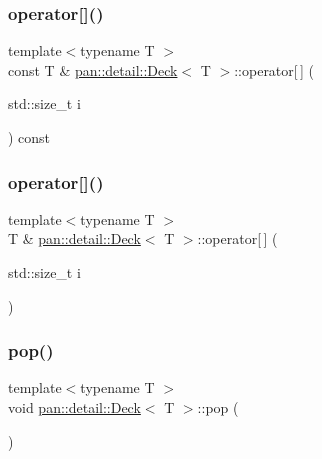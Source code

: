 \subsubsection{\texorpdfstring{operator[]()}{operator[]()}\hspace{0.1cm}{\footnotesize\ttfamily [1/2]}}
{\footnotesize\ttfamily template$<$typename T $>$ \\
const T \& \hyperlink{classpan_1_1detail_1_1_deck}{pan\+::detail\+::\+Deck}$<$ T $>$\+::operator\mbox{[}$\,$\mbox{]} (\begin{DoxyParamCaption}\item[{std\+::size\+\_\+t}]{i }\end{DoxyParamCaption}) const\hspace{0.3cm}{\ttfamily [inline]}}

\mbox{\label{classpan_1_1detail_1_1_deck_ab9d32067fc206985aa116c47cb061809}} 
\subsubsection{\texorpdfstring{operator[]()}{operator[]()}\hspace{0.1cm}{\footnotesize\ttfamily [2/2]}}
{\footnotesize\ttfamily template$<$typename T $>$ \\
T \& \hyperlink{classpan_1_1detail_1_1_deck}{pan\+::detail\+::\+Deck}$<$ T $>$\+::operator\mbox{[}$\,$\mbox{]} (\begin{DoxyParamCaption}\item[{std\+::size\+\_\+t}]{i }\end{DoxyParamCaption})\hspace{0.3cm}{\ttfamily [inline]}}

\mbox{\label{classpan_1_1detail_1_1_deck_ae40b687cc780fbff6411d4679e54b872}} 
\subsubsection{\texorpdfstring{pop()}{pop()}}
{\footnotesize\ttfamily template$<$typename T $>$ \\
void \hyperlink{classpan_1_1detail_1_1_deck}{pan\+::detail\+::\+Deck}$<$ T $>$\+::pop (\begin{DoxyParamCaption}{ }\end{DoxyParamCaption})\hspace{0.3cm}{\ttfamily [inline]}}

